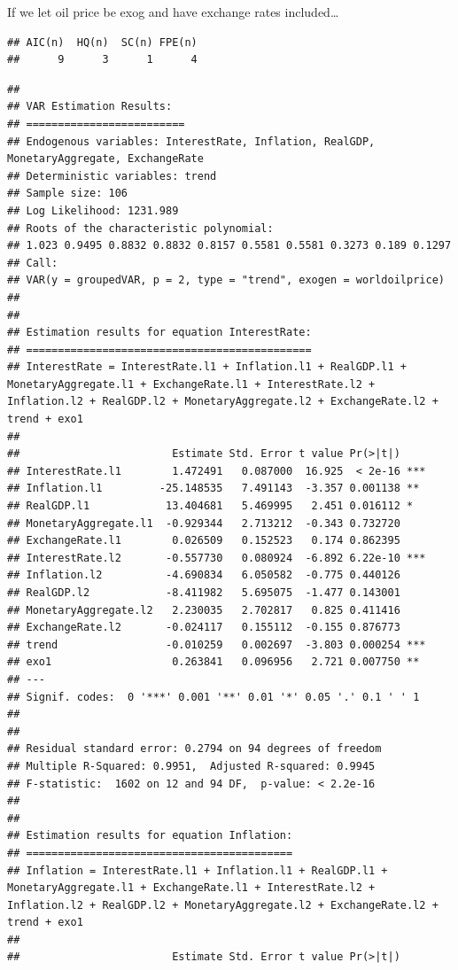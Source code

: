 \documentclass[11pt,preprint, authoryear]{elsarticle}
\numberwithin{equation}{section}
\numberwithin{figure}{section}
\numberwithin{table}{section}
\begin{document}
If we let oil price be exog and have exchange rates included\ldots{}

\begin{verbatim}
## AIC(n)  HQ(n)  SC(n) FPE(n) 
##      9      3      1      4
\end{verbatim}

\begin{verbatim}
## 
## VAR Estimation Results:
## ========================= 
## Endogenous variables: InterestRate, Inflation, RealGDP, MonetaryAggregate, ExchangeRate 
## Deterministic variables: trend 
## Sample size: 106 
## Log Likelihood: 1231.989 
## Roots of the characteristic polynomial:
## 1.023 0.9495 0.8832 0.8832 0.8157 0.5581 0.5581 0.3273 0.189 0.1297
## Call:
## VAR(y = groupedVAR, p = 2, type = "trend", exogen = worldoilprice)
## 
## 
## Estimation results for equation InterestRate: 
## ============================================= 
## InterestRate = InterestRate.l1 + Inflation.l1 + RealGDP.l1 + MonetaryAggregate.l1 + ExchangeRate.l1 + InterestRate.l2 + Inflation.l2 + RealGDP.l2 + MonetaryAggregate.l2 + ExchangeRate.l2 + trend + exo1 
## 
##                        Estimate Std. Error t value Pr(>|t|)    
## InterestRate.l1        1.472491   0.087000  16.925  < 2e-16 ***
## Inflation.l1         -25.148535   7.491143  -3.357 0.001138 ** 
## RealGDP.l1            13.404681   5.469995   2.451 0.016112 *  
## MonetaryAggregate.l1  -0.929344   2.713212  -0.343 0.732720    
## ExchangeRate.l1        0.026509   0.152523   0.174 0.862395    
## InterestRate.l2       -0.557730   0.080924  -6.892 6.22e-10 ***
## Inflation.l2          -4.690834   6.050582  -0.775 0.440126    
## RealGDP.l2            -8.411982   5.695075  -1.477 0.143001    
## MonetaryAggregate.l2   2.230035   2.702817   0.825 0.411416    
## ExchangeRate.l2       -0.024117   0.155112  -0.155 0.876773    
## trend                 -0.010259   0.002697  -3.803 0.000254 ***
## exo1                   0.263841   0.096956   2.721 0.007750 ** 
## ---
## Signif. codes:  0 '***' 0.001 '**' 0.01 '*' 0.05 '.' 0.1 ' ' 1
## 
## 
## Residual standard error: 0.2794 on 94 degrees of freedom
## Multiple R-Squared: 0.9951,  Adjusted R-squared: 0.9945 
## F-statistic:  1602 on 12 and 94 DF,  p-value: < 2.2e-16 
## 
## 
## Estimation results for equation Inflation: 
## ========================================== 
## Inflation = InterestRate.l1 + Inflation.l1 + RealGDP.l1 + MonetaryAggregate.l1 + ExchangeRate.l1 + InterestRate.l2 + Inflation.l2 + RealGDP.l2 + MonetaryAggregate.l2 + ExchangeRate.l2 + trend + exo1 
## 
##                        Estimate Std. Error t value Pr(>|t|)    

\end{verbatim}
\end{document}
